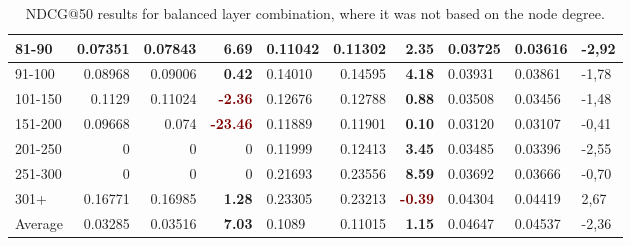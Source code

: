 \begin{table*}[h!]
\begin{tabular}{|l|r|r|r||l|r|r||l|l|l|}
        81-90   & 0.07351                                 & 0.07843                        & \textbf{\textcolor{OliveGreen}{6.69}}  & 0.11042 & 0.11302                  & \textbf{\textcolor{OliveGreen}{2.35}} & 0.03725 & 0.03616                & -2,92                  \\ \hline
        91-100  & 0.08968                                 & 0.09006                        & \textbf{\textcolor{OliveGreen}{0.42}}  & 0.14010 & 0.14595                  & \textbf{\textcolor{OliveGreen}{4.18}} & 0.03931 & 0.03861                & -1,78                  \\ \hline
        101-150 & 0.1129                                  & 0.11024                        & \textbf{\textcolor{Maroon}{-2.36}}     & 0.12676 & 0.12788                  & \textbf{\textcolor{OliveGreen}{0.88}} & 0.03508 & 0.03456                & -1,48                  \\ \hline
        151-200 & 0.09668                                 & 0.074                          & \textbf{\textcolor{Maroon}{-23.46}}    & 0.11889 & 0.11901                  & \textbf{\textcolor{OliveGreen}{0.10}} & 0.03120 & 0.03107                & -0,41                  \\ \hline
        201-250 & 0                                       & 0                              & 0                                      & 0.11999 & 0.12413                  & \textbf{\textcolor{OliveGreen}{3.45}} & 0.03485 & 0.03396                & -2,55                  \\ \hline
        251-300 & 0                                       & 0                              & 0                                      & 0.21693 & 0.23556                  & \textbf{\textcolor{OliveGreen}{8.59}} & 0.03692 & 0.03666                & -0,70                  \\ \hline
        301+    & 0.16771                                 & 0.16985                        & \textbf{\textcolor{OliveGreen}{1.28}}  & 0.23305 & 0.23213                  & \textbf{\textcolor{Maroon}{-0.39}}    & 0.04304 & 0.04419                & 2,67                   \\ \hline
        Average & 0.03285                                 & 0.03516                        & \textbf{\textcolor{OliveGreen}{7.03}}  & 0.1089  & 0.11015                  & \textbf{\textcolor{OliveGreen}{1.15}} & 0.04647 & 0.04537                & -2,36                  \\ \hline
    \end{tabular}
    \caption{NDCG@50 results for balanced layer combination, where it was not based on the node degree.}
    \label{tab:balanced-layer-combination-ndcg}
\end{table*}


